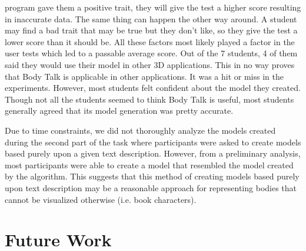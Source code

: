 \documentclass[journal]{vgtc}                %
\begin{document}
program gave them
a positive trait, they will give the test a higher score resulting in inaccurate data. The same thing can happen the other way around. A
student may find
a bad trait that may be true but they don't like, so they give the test a lower score than it should be. All these factors most likely
played a factor in
the user tests which led to a passable average score. Out of the 7 students, 4 of them said they would use their model in other 3D
applications. This in no way proves that Body Talk is applicable in other applications. It was a hit or miss in the experiments.
However, most students felt confident about the model they created. Though not all the students seemed to think Body Talk is useful,
most students generally agreed that its model generation was pretty accurate. \newline

Due to time constraints, we did not thoroughly analyze the models created during the second part of the task where participants
were asked to create models based purely upon a given text description. However, from a preliminary analysis, most participants were
able to create a model that resembled the model created by the algorithm. This suggests that this method of creating models based purely
upon text description may be a reasonable approach for representing bodies that cannot be visualized otherwise (i.e. book characters).

\noindent

\section{Future Work}
\end{document}
